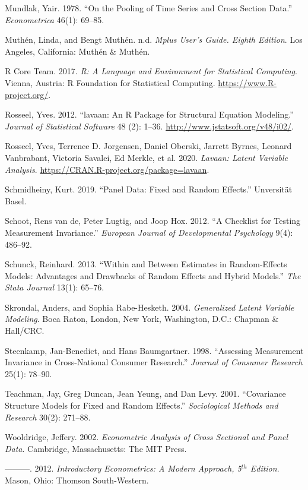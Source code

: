 \documentclass[
  12pt,
  a4paper]{article}
\begin{document}
\leavevmode\hypertarget{ref-Mundlak1978}{}%
Mundlak, Yair. 1978. ``On the Pooling of Time Series and Cross Section
Data.'' \emph{Econometrica} 46(1): 69--85.

\leavevmode\hypertarget{ref-Mplus}{}%
Muthén, Linda, and Bengt Muthén. n.d. \emph{Mplus User's Guide. Eighth
Edition}. Los Angeles, California: Muthén \& Muthén.

\leavevmode\hypertarget{ref-R-base}{}%
R Core Team. 2017. \emph{R: A Language and Environment for Statistical
Computing}. Vienna, Austria: R Foundation for Statistical Computing.
\url{https://www.R-project.org/}.

\leavevmode\hypertarget{ref-R-lavaan}{}%
Rosseel, Yves. 2012. ``lavaan: An R Package for Structural Equation
Modeling.'' \emph{Journal of Statistical Software} 48 (2): 1--36.
\url{http://www.jstatsoft.org/v48/i02/}.

\leavevmode\hypertarget{ref-Rosseel2020}{}%
Rosseel, Yves, Terrence D. Jorgensen, Daniel Oberski, Jarrett Byrnes,
Leonard Vanbrabant, Victoria Savalei, Ed Merkle, et al. 2020.
\emph{Lavaan: Latent Variable Analysis}.
\url{https://CRAN.R-project.org/package=lavaan}.

\leavevmode\hypertarget{ref-Schmidheiny2019}{}%
Schmidheiny, Kurt. 2019. ``Panel Data: Fixed and Random Effects.''
Unversität Basel.

\leavevmode\hypertarget{ref-Schoot2012}{}%
Schoot, Rens van de, Peter Lugtig, and Joop Hox. 2012. ``A Checklist for
Testing Measurement Invariance.'' \emph{European Journal of
Developmental Psychology} 9(4): 486--92.

\leavevmode\hypertarget{ref-Schunck2013}{}%
Schunck, Reinhard. 2013. ``Within and Between Estimates in
Random-Effects Models: Advantages and Drawbacks of Random Effects and
Hybrid Models.'' \emph{The Stata Journal} 13(1): 65--76.

\leavevmode\hypertarget{ref-Skrondal2004}{}%
Skrondal, Anders, and Sophia Rabe-Hesketh. 2004. \emph{Generalized
Latent Variable Modeling}. Boca Raton, London, New York, Washington,
D.C.: Chapman \& Hall/CRC.

\leavevmode\hypertarget{ref-Steenkamp1998}{}%
Steenkamp, Jan-Benedict, and Hans Baumgartner. 1998. ``Assessing
Measurement Invariance in Cross-National Consumer Research.''
\emph{Journal of Consumer Research} 25(1): 78--90.

\leavevmode\hypertarget{ref-Teachman2001}{}%
Teachman, Jay, Greg Duncan, Jean Yeung, and Dan Levy. 2001. ``Covariance
Structure Models for Fixed and Random Effects.'' \emph{Sociological
Methods and Research} 30(2): 271--88.

\leavevmode\hypertarget{ref-Wooldridge2002}{}%
Wooldridge, Jeffery. 2002. \emph{Econometric Analysis of Cross Sectional
and Panel Data}. Cambridge, Massachusetts: The MIT Press.

\leavevmode\hypertarget{ref-Wooldridge2012}{}%
---------. 2012. \emph{Introductory Econometrics: A Modern Approach,
5\(^{th}\) Edition}. Mason, Ohio: Thomson South-Western.
\end{document}
